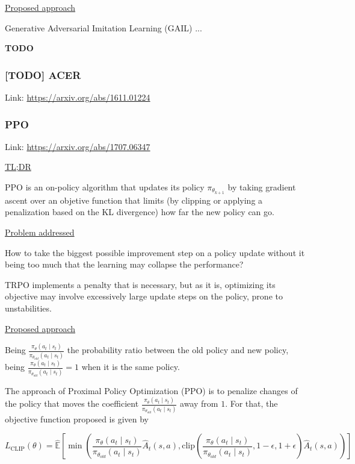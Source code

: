 \documentclass[12pt, english]{article}
\begin{document}
\underline{Proposed approach}

Generative Adversarial Imitation Learning (GAIL) ...

\textbf{TODO}


\subsubsection{[TODO] ACER}
\label{ACER}

Link: \url{https://arxiv.org/abs/1611.01224}


\subsubsection{PPO}
\label{PPO}

Link: \url{https://arxiv.org/abs/1707.06347}

\underline{TL;DR}

PPO \cite{schulman_proximal_2017} is an on-policy algorithm that updates its policy $\pi_{\theta_{k+1}}$ by taking gradient ascent over an objetive function that limits (by clipping or applying a penalization based on the KL divergence) how far the new policy can go.

\underline{Problem addressed}

How to take the biggest possible improvement step on a policy update without it being too much that the learning may collapse the performance?

TRPO implements a penalty that is necessary, but as it is, optimizing its objective may involve excessively large update steps on the policy, prone to unstabilities.

\underline{Proposed approach}

Being $\frac{\pi_\theta(a_t \mid s_t)}{\pi_{\theta_{old}} (a_t \mid s_t)}$ the probability ratio between the old policy and new policy, being $\frac{\pi_\theta(a_t \mid s_t)}{\pi_{\theta_{old}} (a_t \mid s_t)} = 1$ when it is the same policy.

The approach of Proximal Policy Optimization (PPO) is to penalize changes of the policy that moves the coefficient $\frac{\pi_\theta(a_t \mid s_t)}{\pi_{\theta_{old}} (a_t \mid s_t)}$ away from $1$. For that, the objective function proposed is given by

\begin{equation}
  \label{eqn_clipped_objective}
  L_{\text{CLIP}} (\theta) = \hat{\mathbb{E}} [\min (\frac{\pi_\theta(a_t \mid s_t)}{\pi_{\theta_{old}} (a_t \mid s_t)} \hat{A}_t(s,a), \text{clip} (\frac{\pi_\theta(a_t \mid s_t)}{\pi_{\theta_{old}} (a_t \mid s_t)},1-\epsilon, 1+\epsilon) \hat{A}_t(s,a))]
\end{equation}
\end{document}
